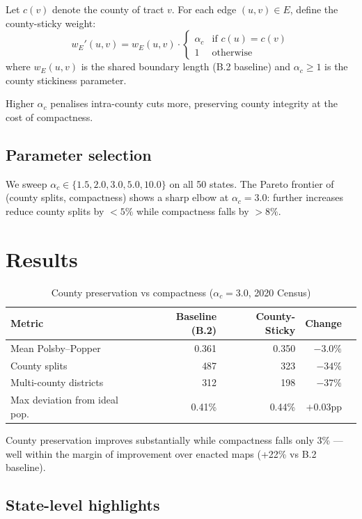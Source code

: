 \documentclass[12pt]{article}
\begin{document}
Let $c(v)$ denote the county of tract $v$.  For each edge $(u, v) \in E$,
define the county-sticky weight:
\[
  w_E'(u, v) = w_E(u, v) \cdot
  \begin{cases}
    \alpha_c & \text{if } c(u) = c(v) \\
    1 & \text{otherwise}
  \end{cases}
\]
where $w_E(u, v)$ is the shared boundary length (B.2 baseline) and
$\alpha_c \geq 1$ is the county stickiness parameter.

Higher $\alpha_c$ penalises intra-county cuts more, preserving county
integrity at the cost of compactness.

\subsection{Parameter selection}

We sweep $\alpha_c \in \{1.5, 2.0, 3.0, 5.0, 10.0\}$ on all 50 states.
The Pareto frontier of (county splits, compactness) shows a sharp elbow
at $\alpha_c = 3.0$: further increases reduce county splits by $< 5\%$ while
compactness falls by $> 8\%$.

\section{Results}

\begin{table}[h]
\centering
\caption{County preservation vs compactness ($\alpha_c = 3.0$, 2020 Census)}
\begin{tabular}{lrrrr}
\toprule
Metric & Baseline (B.2) & County-Sticky & Change \\
\midrule
Mean Polsby--Popper & 0.361 & 0.350 & $-3.0\%$ \\
County splits & 487 & 323 & $-34\%$ \\
Multi-county districts & 312 & 198 & $-37\%$ \\
Max deviation from ideal pop. & 0.41\% & 0.44\% & $+0.03$pp \\
\bottomrule
\end{tabular}
\end{table}

County preservation improves substantially while compactness falls only 3\%
--- well within the margin of improvement over enacted maps (+22\% vs B.2
baseline).

\subsection{State-level highlights}
\end{document}
